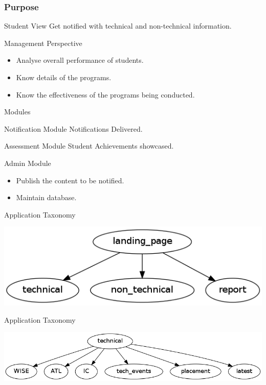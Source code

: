 \documentclass[14pt]{beamer}
\begin{document}
\begin{frame}
\frametitle{Purpose}
\begin{block}{Student View}
	Get notified with technical and non-technical information.
\end{block}
\begin{block}{Management Perspective}
	\begin{itemize}
		\item Analyse overall performance of students.
		\item Know details of the programs. 
		\item Know the effectiveness of the programs being conducted.
	\end{itemize}
\end{block}
\end{frame}

\begin{frame}{Modules}
	\begin{block}{Notification Module}
		Notifications Delivered.
	\end{block}
	\begin{block}{Assessment Module}
		Student Achievements showcased.
	\end{block}
	\begin{block}{Admin Module}
		\begin{itemize}
		\item Publish the content to be notified.
		\item Maintain database.
		\end{itemize}
	\end{block}
\end{frame}

\begin{frame}{Application Taxonomy}
	\begin{center}
	\includegraphics[scale = 0.45]{spin.png}
	\end{center}
\end{frame}

\begin{frame}{Application Taxonomy}
	\begin{center}
	\includegraphics[scale = 0.38]{tech.png}
	\end{center}
\end{frame}
\end{document}
